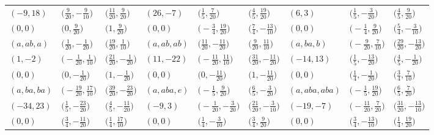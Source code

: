 \documentclass[10pt,a4paper]{amsart}
\theoremstyle{definition}
\numberwithin{equation}{section}
\begin{document}
\begin{landscape}
\begin{table}[th]
\begin{tabular}{|lll|lll|lll|}
\\
$(-9, 18)$ & $\bigl(\frac{9}{20}, -\frac{9}{10}\bigr)$ & $\bigl(\frac{11}{20}, \frac{9}{20}\bigr)$ & $(26, -7)$ & $\bigl(\frac{1}{5}, \frac{7}{20}\bigr)$ & $\bigl(\frac{4}{5}, \frac{19}{20}\bigr)$ & $(6, 3)$ & $\bigl(\frac{1}{5}, -\frac{3}{20}\bigr)$ & $\bigl(\frac{4}{5}, \frac{9}{20}\bigr)$
\\
$(0, 0)$ & $\bigl(0, \frac{9}{20}\bigr)$ & $\bigl(1, \frac{9}{20}\bigr)$ & $(0, 0)$ & $\bigl(-\frac{3}{4}, \frac{19}{20}\bigr)$ & $\bigl(\frac{7}{4}, -\frac{13}{10}\bigr)$ & $(0, 0)$ & $\bigl(-\frac{1}{4}, \frac{9}{20}\bigr)$ & $\bigl(\frac{5}{4}, -\frac{3}{10}\bigr)$
\\\hline
$(a, ab, a)$ & $\bigl(\frac{1}{20}, -\frac{1}{20}\bigr)$ & $\bigl(\frac{19}{20}, \frac{1}{10}\bigr)$ & $(a, ab, ab)$ & $\bigl(\frac{11}{20}, -\frac{11}{20}\bigr)$ & $\bigl(\frac{9}{20}, \frac{11}{10}\bigr)$ & $(a, ba, b)$ & $\bigl(-\frac{9}{20}, \frac{7}{10}\bigr)$ & $\bigl(\frac{29}{20}, -\frac{13}{20}\bigr)$ \\
$(1, -2)$ & $\bigl(-\frac{1}{20}, \frac{1}{10}\bigr)$ & $\bigl(\frac{21}{20}, -\frac{1}{20}\bigr)$ & $(11, -22)$ & $\bigl(-\frac{11}{20}, \frac{11}{10}\bigr)$ & $\bigl(\frac{31}{20}, -\frac{11}{20}\bigr)$ & $(-14, 13)$ & $\bigl(\frac{1}{5}, -\frac{13}{20}\bigr)$ & $\bigl(\frac{4}{5}, -\frac{1}{20}\bigr)$
\\
$(0, 0)$ & $\bigl(0, -\frac{1}{20}\bigr)$ & $\bigl(1, -\frac{1}{20}\bigr)$ & $(0, 0)$ & $\bigl(0, -\frac{11}{20}\bigr)$ & $\bigl(1, -\frac{11}{20}\bigr)$ & $(0, 0)$ & $\bigl(\frac{1}{4}, -\frac{1}{20}\bigr)$ & $\bigl(\frac{3}{4}, \frac{7}{10}\bigr)$
\\\hline
$(a, ba, ba)$ & $\bigl(-\frac{19}{20}, \frac{17}{10}\bigr)$ & $\bigl(\frac{39}{20}, -\frac{23}{20}\bigr)$ & $(a, aba, e)$ & $\bigl(-\frac{1}{5}, \frac{9}{20}\bigr)$ & $\bigl(\frac{6}{5}, -\frac{3}{20}\bigr)$ & $(a, aba, aba)$ & $\bigl(-\frac{1}{5}, \frac{19}{20}\bigr)$ & $\bigl(\frac{6}{5}, \frac{7}{20}\bigr)$
\\
$(-34, 23)$ & $\bigl(\frac{1}{5}, -\frac{23}{20}\bigr)$ & $\bigl(\frac{4}{5}, -\frac{11}{20}\bigr)$ & $(-9, 3)$ & $\bigl(-\frac{1}{20}, -\frac{3}{20}\bigr)$ & $\bigl(\frac{21}{20}, -\frac{3}{10}\bigr)$ & $(-19, -7)$ & $\bigl(-\frac{11}{20}, \frac{7}{20}\bigr)$ & $\bigl(\frac{31}{20}, -\frac{13}{10}\bigr)$
\\
$(0, 0)$ & $\bigl(\frac{3}{4}, -\frac{11}{20}\bigr)$ & $\bigl(\frac{1}{4}, \frac{17}{10}\bigr)$ & $(0, 0)$ & $\bigl(\frac{1}{4}, -\frac{3}{10}\bigr)$ & $\bigl(\frac{3}{4}, \frac{9}{20}\bigr)$ & $(0, 0)$ & $\bigl(\frac{3}{4}, -\frac{13}{10}\bigr)$ & $\bigl(\frac{1}{4}, \frac{19}{20}\bigr)$

\end{tabular}
\end{table}
\end{landscape}
\end{document}
